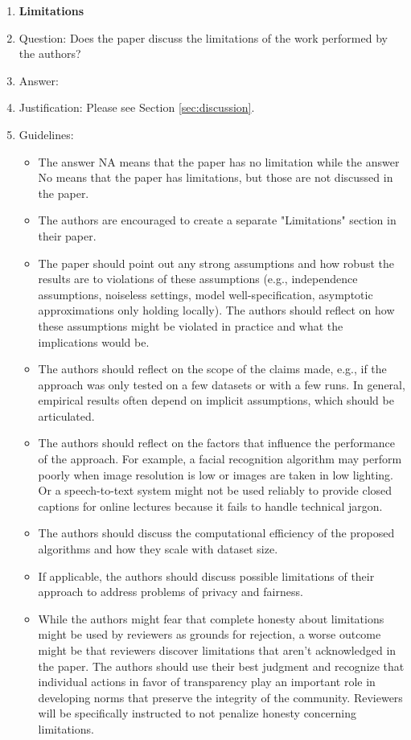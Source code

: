 \documentclass{article}
\begin{document}
\begin{enumerate}
\item {\bf Limitations}
    \item[] Question: Does the paper discuss the limitations of the work performed by the authors?
    \item[] Answer: \answerYes{} %
    \item[] Justification: Please see Section \ref{sec:discussion}.
    \item[] Guidelines:
    \begin{itemize}
        \item The answer NA means that the paper has no limitation while the answer No means that the paper has limitations, but those are not discussed in the paper. 
        \item The authors are encouraged to create a separate "Limitations" section in their paper.
        \item The paper should point out any strong assumptions and how robust the results are to violations of these assumptions (e.g., independence assumptions, noiseless settings, model well-specification, asymptotic approximations only holding locally). The authors should reflect on how these assumptions might be violated in practice and what the implications would be.
        \item The authors should reflect on the scope of the claims made, e.g., if the approach was only tested on a few datasets or with a few runs. In general, empirical results often depend on implicit assumptions, which should be articulated.
        \item The authors should reflect on the factors that influence the performance of the approach. For example, a facial recognition algorithm may perform poorly when image resolution is low or images are taken in low lighting. Or a speech-to-text system might not be used reliably to provide closed captions for online lectures because it fails to handle technical jargon.
        \item The authors should discuss the computational efficiency of the proposed algorithms and how they scale with dataset size.
        \item If applicable, the authors should discuss possible limitations of their approach to address problems of privacy and fairness.
        \item While the authors might fear that complete honesty about limitations might be used by reviewers as grounds for rejection, a worse outcome might be that reviewers discover limitations that aren't acknowledged in the paper. The authors should use their best judgment and recognize that individual actions in favor of transparency play an important role in developing norms that preserve the integrity of the community. Reviewers will be specifically instructed to not penalize honesty concerning limitations.
    \end{itemize}


\end{enumerate}
\end{document}
